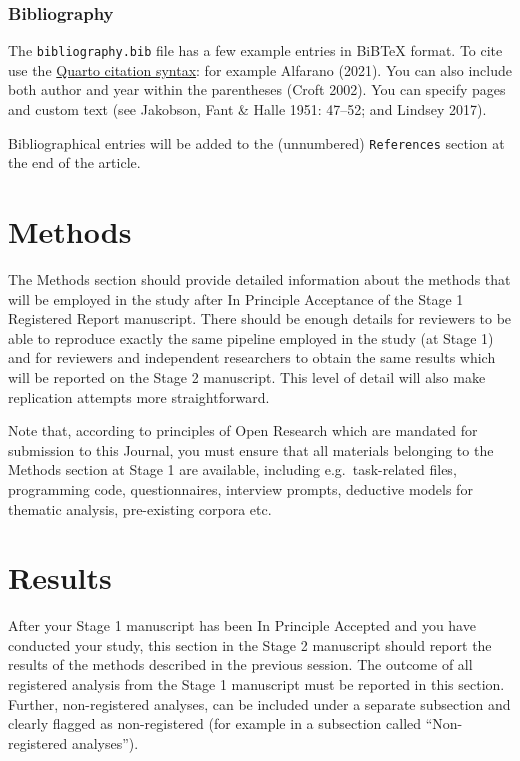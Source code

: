 \documentclass[
]{rrling}
\begin{document}
\subsubsection*{Bibliography}\label{bibliography}

The \texttt{bibliography.bib} file has a few example entries in BiBTeX
format. To cite use the
\href{https://quarto.org/docs/authoring/citations.html}{Quarto citation
syntax}: for example Alfarano (2021). You can also include both author
and year within the parentheses (Croft 2002). You can specify pages and
custom text (see Jakobson, Fant \& Halle 1951: 47--52; and Lindsey
2017).

Bibliographical entries will be added to the (unnumbered)
\texttt{References} section at the end of the article.

\section{Methods}\label{methods}

The Methods section should provide detailed information about the
methods that will be employed in the study after In Principle Acceptance
of the Stage 1 Registered Report manuscript. There should be enough
details for reviewers to be able to reproduce exactly the same pipeline
employed in the study (at Stage 1) and for reviewers and independent
researchers to obtain the same results which will be reported on the
Stage 2 manuscript. This level of detail will also make replication
attempts more straightforward.

Note that, according to principles of Open Research which are mandated
for submission to this Journal, you must ensure that all materials
belonging to the Methods section at Stage 1 are available, including
e.g.~task-related files, programming code, questionnaires, interview
prompts, deductive models for thematic analysis, pre-existing corpora
etc.

\section{Results}\label{results}

After your Stage 1 manuscript has been In Principle Accepted and you
have conducted your study, this section in the Stage 2 manuscript should
report the results of the methods described in the previous session. The
outcome of all registered analysis from the Stage 1 manuscript must be
reported in this section. Further, non-registered analyses, can be
included under a separate subsection and clearly flagged as
non-registered (for example in a subsection called ``Non-registered
analyses'').
\end{document}
